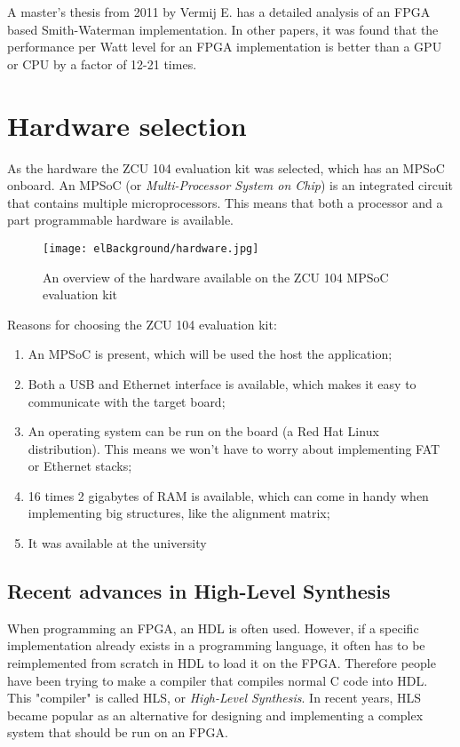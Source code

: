 A master's thesis from 2011 by Vermij E. has a detailed analysis of an FPGA based Smith-Waterman implementation. In other papers, it was found that the performance per Watt level for an FPGA implementation is better than a GPU or CPU by a factor of 12-21 times.

\section{Hardware selection}

As the hardware the ZCU 104 evaluation kit was selected, which has an MPSoC onboard. An MPSoC (or \emph{Multi-Processor System on Chip}) is an integrated circuit that contains multiple microprocessors. This means that both a processor and a part programmable hardware is available.

\begin{figure}[H]
	\centering
	\texttt{[image: elBackground/hardware.jpg]}
	\caption{An overview of the hardware available on the ZCU 104 MPSoC evaluation kit}
	\label{fig:hardware}
\end{figure}

Reasons for choosing the ZCU 104 evaluation kit:
\begin{enumerate}
	\item An MPSoC is present, which will be used the host the application;
	\item Both a USB and Ethernet interface is available, which makes it easy to communicate with the target board;
	\item An operating system can be run on the board (a Red Hat Linux distribution). This means we won't have to worry about implementing FAT or Ethernet stacks;
	\item 16 times 2 gigabytes of RAM is available, which can come in handy when implementing big structures, like the alignment matrix;
	\item It was available at the university
\end{enumerate}

\subsection{Recent advances in High-Level Synthesis}

When programming an FPGA, an HDL is often used. However, if a specific implementation already exists in a programming language, it often has to be reimplemented from scratch in HDL to load it on the FPGA. Therefore people have been trying to make a compiler that compiles normal C code into HDL. This "compiler" is called HLS, or \emph{ High-Level Synthesis}. In recent years, HLS became popular as an alternative for designing and implementing a complex system that should be run on an FPGA.

